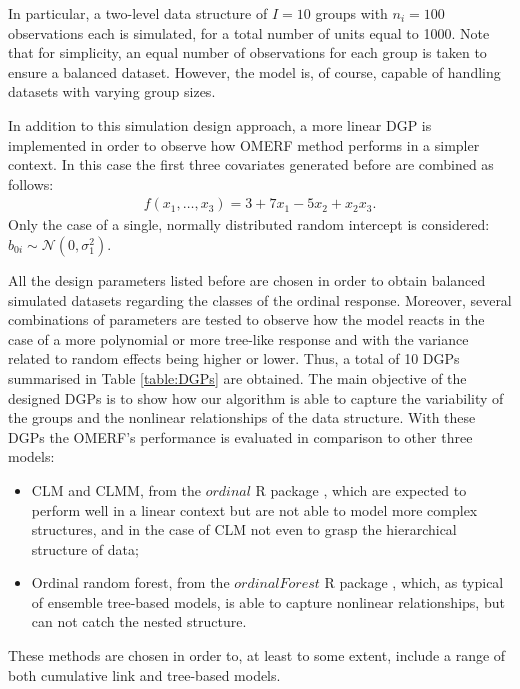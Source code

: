 In particular, a two-level data structure of \(I = 10\) groups with \(n_{i} = 100\) observations each is simulated, for a total number of units equal to 1000.
Note that for simplicity, an equal number of observations for each group is taken to ensure a balanced dataset. However, the model is, of course, capable of handling datasets with varying group sizes.

In addition to this simulation design approach, a more linear DGP is implemented in order to observe how OMERF method performs in a simpler context. In this case the first three covariates generated before are combined as follows:
\begin{equation}
    \label{eq:simstudy3}
    \begin{aligned}
        f(x_{1}, \dots,x_{3}) = 3+7x_{1}-5x_{2}+x_{2}x_{3}.
    \end{aligned}
\end{equation}
Only the case of a single, normally distributed random intercept is considered: \(b_{0i} \sim \mathcal{N}(0, \sigma^2_1)\).

All the design parameters listed before are chosen in order to obtain balanced simulated datasets regarding the classes of the ordinal response.
Moreover, several combinations of parameters are tested to observe how the model reacts in the case of a more polynomial or more tree-like response and with the variance related to random effects being higher or lower.
Thus, a total of 10 DGPs summarised in Table \ref{table:DGPs} are obtained. The main objective of the designed DGPs is to show how our algorithm is able to capture the variability of the groups and the nonlinear relationships of the data structure.
With these DGPs the OMERF's performance is evaluated in comparison to other three models: 
\begin{itemize}
    \item CLM and CLMM, from the \(ordinal\) R package \cite{ordinal}, which are expected to perform well in a linear context but are not able to model more complex structures, and in the case of CLM not even to grasp the hierarchical structure of data;
    \item Ordinal random forest, from the \(ordinalForest\) R package \cite{hornung2020ordinal}, which, as typical of ensemble tree-based models, is able to capture nonlinear relationships, but can not catch the nested structure.
\end{itemize}
These methods are chosen in order to, at least to some extent, include a range of both cumulative link and tree-based models.

